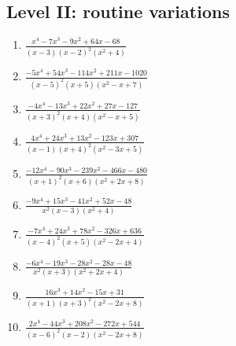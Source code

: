 \documentclass[11pt,oneside]{book}
\begin{document}
\subsection*{Level II: routine variations}
\begin{enumerate}[leftmargin=*,label=\textbf{\arabic*.},itemsep=0.65\baselineskip]
\item $\displaystyle \frac{x^{4} - 7 x^{3} - 9 x^{2} + 64 x - 68}{\left(x - 3\right) \left(x - 2\right)^{2} \left(x^{2} + 4\right)}$
\item $\displaystyle \frac{- 5 x^{4} + 54 x^{3} - 114 x^{2} + 211 x - 1020}{\left(x - 5\right)^{2} \left(x + 5\right) \left(x^{2} - x + 7\right)}$
\item $\displaystyle \frac{- 4 x^{4} - 13 x^{3} + 22 x^{2} + 27 x - 127}{\left(x + 3\right)^{2} \left(x + 4\right) \left(x^{2} - x + 5\right)}$
\item $\displaystyle \frac{4 x^{4} + 24 x^{3} + 13 x^{2} - 123 x + 307}{\left(x - 1\right) \left(x + 4\right)^{2} \left(x^{2} - 3 x + 5\right)}$
\item $\displaystyle \frac{- 12 x^{4} - 90 x^{3} - 239 x^{2} - 466 x - 480}{\left(x + 1\right)^{2} \left(x + 6\right) \left(x^{2} + 2 x + 8\right)}$
\item $\displaystyle \frac{- 9 x^{4} + 15 x^{3} - 41 x^{2} + 52 x - 48}{x^{2} \left(x - 3\right) \left(x^{2} + 4\right)}$
\item $\displaystyle \frac{- 7 x^{4} + 24 x^{3} + 78 x^{2} - 326 x + 636}{\left(x - 4\right)^{2} \left(x + 5\right) \left(x^{2} - 2 x + 4\right)}$
\item $\displaystyle \frac{- 6 x^{4} - 19 x^{3} - 28 x^{2} - 28 x - 48}{x^{2} \left(x + 3\right) \left(x^{2} + 2 x + 4\right)}$
\item $\displaystyle \frac{16 x^{3} + 14 x^{2} - 15 x + 31}{\left(x + 1\right) \left(x + 3\right)^{2} \left(x^{2} - 2 x + 8\right)}$
\item $\displaystyle \frac{2 x^{4} - 44 x^{3} + 208 x^{2} - 272 x + 544}{\left(x - 6\right)^{2} \left(x - 2\right) \left(x^{2} - 2 x + 8\right)}$
\end{enumerate}
\end{document}
